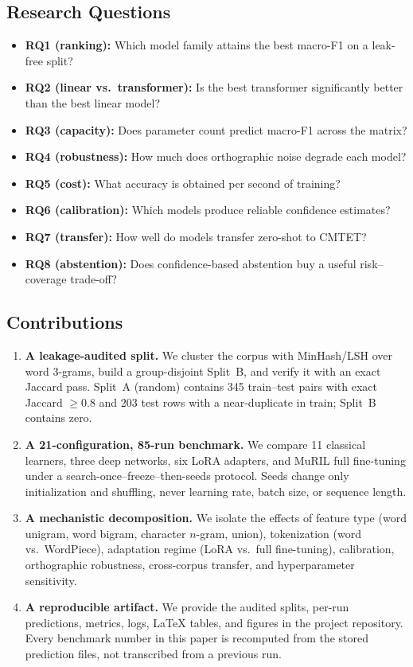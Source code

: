 \documentclass[10pt,journal]{IEEEtran}
\begin{document}
\subsection{Research Questions}
\begin{itemize}
\item \textbf{RQ1 (ranking):} Which model family attains the best macro-F1 on a leak-free split?
\item \textbf{RQ2 (linear vs.\ transformer):} Is the best transformer significantly better than the best linear model?
\item \textbf{RQ3 (capacity):} Does parameter count predict macro-F1 across the matrix?
\item \textbf{RQ4 (robustness):} How much does orthographic noise degrade each model?
\item \textbf{RQ5 (cost):} What accuracy is obtained per second of training?
\item \textbf{RQ6 (calibration):} Which models produce reliable confidence estimates?
\item \textbf{RQ7 (transfer):} How well do models transfer zero-shot to CMTET?
\item \textbf{RQ8 (abstention):} Does confidence-based abstention buy a useful risk--coverage trade-off?
\end{itemize}

\subsection{Contributions}
\begin{enumerate}
\item \textbf{A leakage-audited split.} We cluster the corpus with MinHash/LSH over word 3-grams, build a group-disjoint Split~B, and verify it with an exact Jaccard pass. Split~A (random) contains 345 train--test pairs with exact Jaccard $\geq0.8$ and 203 test rows with a near-duplicate in train; Split~B contains zero.
\item \textbf{A 21-configuration, 85-run benchmark.} We compare 11 classical learners, three deep networks, six LoRA adapters, and MuRIL full fine-tuning under a search-once--freeze--then-seeds protocol. Seeds change only initialization and shuffling, never learning rate, batch size, or sequence length.
\item \textbf{A mechanistic decomposition.} We isolate the effects of feature type (word unigram, word bigram, character $n$-gram, union), tokenization (word vs.\ WordPiece), adaptation regime (LoRA vs.\ full fine-tuning), calibration, orthographic robustness, cross-corpus transfer, and hyperparameter sensitivity.
\item \textbf{A reproducible artifact.} We provide the audited splits, per-run predictions, metrics, logs, LaTeX tables, and figures in the project repository. Every benchmark number in this paper is recomputed from the stored prediction files, not transcribed from a previous run.
\end{enumerate}
\end{document}
